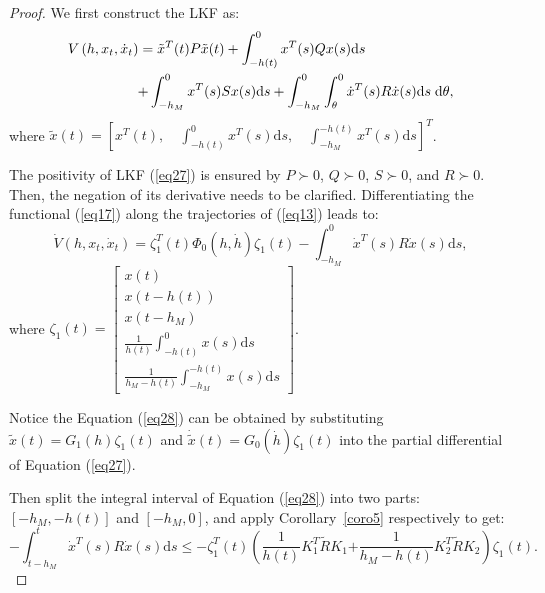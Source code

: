 \documentclass[a4paper]{cas-sc}
\newtheorem*{proof}{Proof}
\begin{document}
\begin{proof}
  We first construct the LKF as:
  \begin{equation}
    \label{eq27}
    \begin{gathered}
      V\left( {h,{x_t},{{\dot x}_t}} \right) = {{\tilde x}^T}(t)P\tilde x(t) + \int_{ - h(t)}^0 {{x^T}} (s)Qx(s){\text{d}}s \hfill \\
      \quad \quad \quad \quad \quad  + \int_{ - {h_M}}^0 {{x^T}} (s)Sx(s){\text{d}}s + \int_{ - {h_M}}^0 {\int_\theta ^0 {{{\dot x}^T}(s)R\dot x(s){\text{d}}s\;{\text{d}}\theta } },  \hfill \\
    \end{gathered}
  \end{equation}
  where $ \tilde x(t) = {\left[ {{x^T}(t),\quad \int_{ - h(t)}^0 {{x^T}} (s){\text{d}}s,\quad \int_{ - {h_M}}^{ - h(t)} {{x^T}} (s){\text{d}}s} \right]^T} $.

  The positivity of LKF (\ref{eq27}) is ensured by $ P \succ 0 $, $ Q \succ 0 $, $ S \succ 0 $, and $ R \succ 0 $. Then, the negation of its derivative needs to be clarified. Differentiating the functional (\ref{eq17}) along the trajectories of (\ref{eq13}) leads to:
  \begin{equation}
    \label{eq28}
    \dot V\left( {h,{x_t},{{\dot x}_t}} \right) = \zeta _1^T(t){\Phi _0}(h,\dot h){\zeta _1}(t) - \int_{ - {h_M}}^0 {{{\dot x}^T}} (s)R\dot x(s){\text{d}}s,
  \end{equation}
  where $ {\zeta _1}(t) = \left[ {\begin{array}{*{20}{c}}
            {x(t)}                                              \\
            {x(t - h(t))}                                       \\
            {x\left( {t - {h_M}} \right)}                       \\
            {\frac{1}{{h(t)}}\int_{ - h(t)}^0 x (s){\text{d}}s} \\
            {\frac{1}{{{h_M} - h(t)}}\int_{ - {h_M}}^{ - h(t)} x (s){\text{d}}s}
          \end{array}} \right] $.

  Notice the Equation (\ref{eq28}) can be obtained by substituting $ \tilde x(t) = {G_1}(h){\zeta _1}(t) $ and $ \dot {\tilde x}(t) = {G_0}(\dot h){\zeta _1}(t) $ into the partial differential of Equation (\ref{eq27}).

  Then split the integral interval of Equation (\ref{eq28}) into two parts: $ [ - {h_M}, - h(t)] $ and $ [ - {h_M},0] $, and apply Corollary~\ref{coro5} respectively to get:
  \begin{equation}
    \label{eq29}
    - \int_{t - {h_M}}^t {{{\dot x}^T}} (s)R\dot x(s){\text{d}}s \leqslant  - \zeta _1^T(t)\left( {\frac{1}{{h(t)}}K_1^T\tilde R{K_1}} \right.\left. { + \frac{1}{{{h_M} - h(t)}}K_2^T\tilde R{K_2}} \right){\zeta _1}(t).
  \end{equation}


\end{proof}
\end{document}
